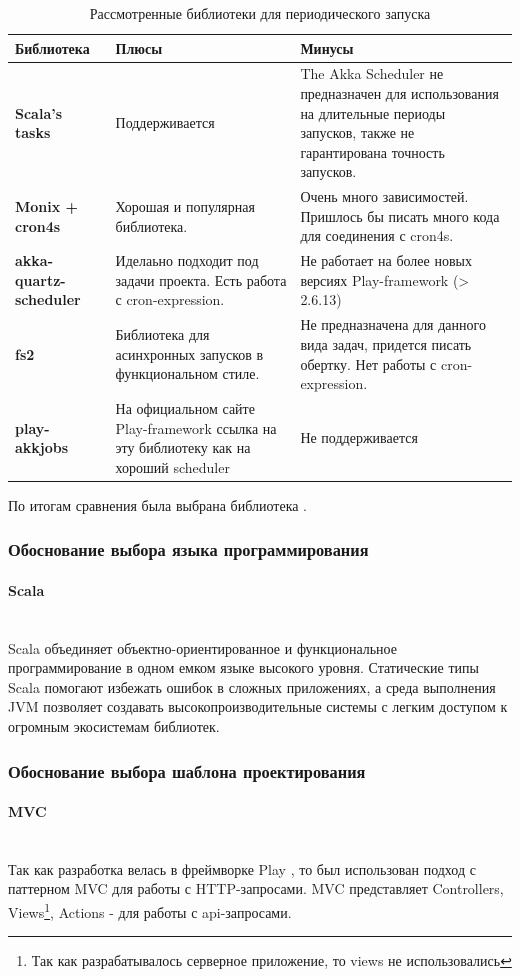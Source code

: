 \documentclass[a4paper,12pt]{article}
\begin{document}
	\begin{longtable}[]{|>{\bfseries}l| p{5cm}|p{5cm}|} 
\caption{Рассмотренные библиотеки для периодического запуска}
\hline
\textbf{Библиотека} & \textbf{Плюсы} & \textbf{Минусы} \\ \hline
    Scala's tasks            & Поддерживается & The Akka Scheduler не предназначен для использования на длительные периоды запусков, также не гарантирована точность запусков. \\ \hline
    Monix + cron4s           & Хорошая и популярная библиотека. & Очень много зависимостей. Пришлось бы писать много кода для соединения с cron4s. \\ \hline
    akka-quartz-scheduler    &  Иделаьно подходит под задачи проекта. Есть работа с cron-expression. & Не работает на более новых версиях Play-framework \cite{play} (> 2.6.13)\\ \hline
    fs2      & Библиотека для асинхронных запусков в функциональном стиле. & Не предназначена для данного вида задач, придется писать обертку. Нет работы с cron-expression.  \\ \hline
    play-akkjobs       &  На официальном сайте Play-framework ссылка на эту библиотеку как на хороший scheduler & Не поддерживается \\ \hline
\end{longtable}
	
	По итогам сравнения была выбрана библиотека .
	\subsubsection{Обоснование выбора языка программирования}
	\paragraph{Scala\\ \\}
	
	Scala объединяет объектно-ориентированное и функциональное программирование в одном емком языке высокого уровня. Статические типы Scala помогают избежать ошибок в сложных приложениях, а среда выполнения JVM  позволяет создавать высокопроизводительные системы с легким доступом к огромным экосистемам библиотек.
	
	\subsubsection{Обоснование выбора шаблона проектирования}
	\paragraph{MVC\\ \\}
	Так как разработка велась в фреймворке Play \cite{play}, то был использован подход с паттерном MVC \cite{play-mvc} для работы с HTTP-запросами. MVC представляет Controllers, Views\footnote{Так как разрабатывалось серверное приложение, то views не использовались}, Actions - для работы с api-запросами.
\end{document}
